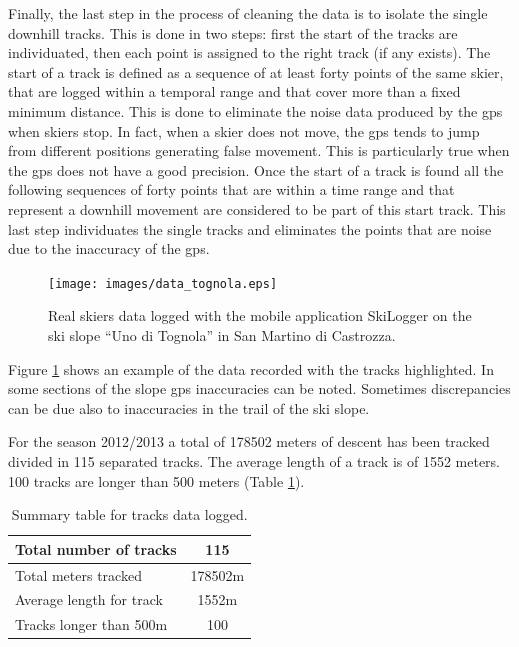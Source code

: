\documentclass[12pt,a4paper,twoside]{book}
\begin{document}
Finally, the last step in the process of cleaning the data is to isolate the single downhill tracks. This is done in two steps: first the start of the tracks are individuated, then each point is assigned to the right track (if any exists). The start of a track is defined as a sequence of at least forty points of the same skier, that are logged within a temporal range and that cover more than a fixed minimum distance. This is done to eliminate the noise data produced by the gps when skiers stop. In fact, when a skier does not move, the gps tends to jump from different positions generating false movement. This is particularly true when the gps does not have a good precision. Once the start of a track is found all the following sequences of forty points that are within a time range and that represent a downhill movement are considered to be part of this start track. This last step individuates the single tracks and eliminates the points that are noise due to the inaccuracy of the gps.

\begin{figure}[!h]
  \begin{center}
    \texttt{[image: images/data\_tognola.eps]}
    \caption{Real skiers data logged with the mobile application SkiLogger on the ski slope ``Uno di Tognola'' in San Martino di Castrozza.}\label{data_tognola}
  \end{center}
\end{figure}

Figure \ref{data_tognola} shows an example of the data recorded with the tracks highlighted. In some sections of the slope gps inaccuracies can be noted. Sometimes discrepancies can be due also to inaccuracies in the trail of the ski slope.

For the season 2012/2013 a total of 178502 meters of descent has been tracked divided in 115 separated tracks. The average length of a track is of 1552 meters. 100 tracks are longer than 500 meters (Table \ref{descendts}).

\begin{table}[!h]
  \centering
  \begin{tabular}{ | l | c | }
    \hline
    Total number of tracks & 115 \\ \hline
    Total meters tracked & 178502m \\ \hline
    Average length for track & 1552m \\ \hline
    Tracks longer than 500m & 100 \\
    \hline
  \end{tabular}
  \caption{Summary table for tracks data logged.}
  \label{descendts}
\end{table}
\end{document}
